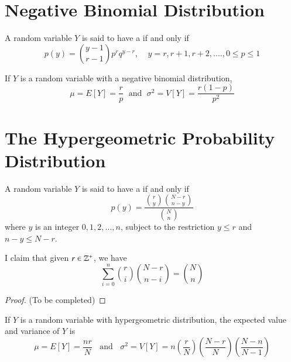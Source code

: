 \documentclass[12pt, a4paper, twoside, openright, titlepage]{book}
\begin{document}
\section{\textsection Negative Binomial Distribution}

\begin{defn}{}{}
    A random variable $Y$ is said to have a  if and only if \begin{equation*}
        p(y) = \binom{y-1}{r-1}p^rq^{y-r},\;\;\;\; y = r,r+1,r+2,...., 0\leq p \leq 1
    \end{equation*}
\end{defn}


\begin{thm}{}{}
    If $Y$ is a random variable with a negative binomial distribution, \begin{equation*}
        \mu = E[Y] = \frac{r}{p} \;\text{ and }\; \sigma^2 = V[Y] = \frac{r(1-p)}{p^2}
    \end{equation*}
\end{thm}



\section{\textsection The Hypergeometric Probability Distribution}

\begin{defn}{}{}
    A random variable $Y$ is said to have a  if and only if \begin{equation*}
        p(y) = \frac{\binom{r}{y}\binom{N-r}{n-y}}{\binom{N}{n}}
    \end{equation*}
    where $y$ is an integer $0,1,2,...,n$, subject to the restriction $y \leq r$ and $n-y \leq N-r$.
\end{defn}


\begin{claim}{}{}
    I claim that given $r \in \mathbb Z^+$, we have \begin{equation*}
        \sum\limits_{i=0}^{n}\binom{r}{i}\binom{N-r}{n-i} = \binom{N}{n}
    \end{equation*}
\end{claim}
\begin{proof}{}{}
    (To be completed)
\end{proof}


\begin{thm}{}{}
    If $Y$ is a random variable with hypergeometric distribution, the expected value and variance of $Y$ is \begin{equation*}
        \mu = E[Y] = \frac{nr}{N}\;\;\text{ and }\;\;\sigma^2 = V[Y] = n\left(\frac{r}{N}\right)\left(\frac{N-r}{N}\right)\left(\frac{N-n}{N-1}\right)
    \end{equation*}
\end{thm}
\end{document}
